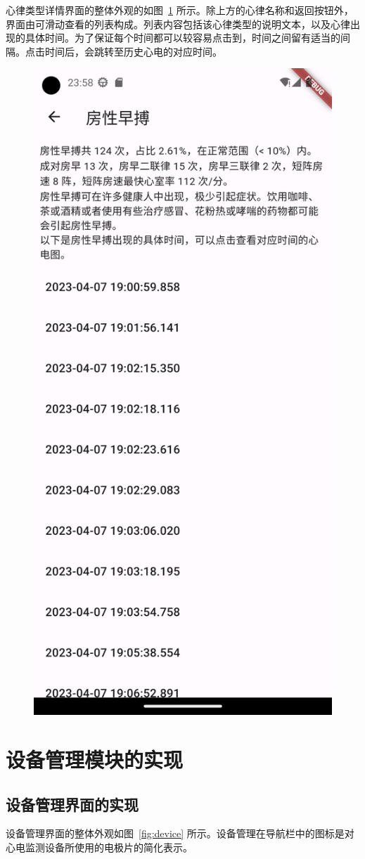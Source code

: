 心律类型详情界面的整体外观的如图~\ref{fig:label-details} 所示。除上方的心律名称和返回按钮外，界面由可滑动查看的列表构成。列表内容包括该心律类型的说明文本，以及心律出现的具体时间。为了保证每个时间都可以较容易点击到，时间之间留有适当的间隔。点击时间后，会跳转至历史心电的对应时间。

\begin{figure}[ht]
    \centering
    \includegraphics[width=.33\textwidth]{../assets/label-details}
    \label{fig:label-details}
\end{figure}



\section{设备管理模块的实现}\label{sec:device}

\subsection{设备管理界面的实现}\label{subsec:device-ui}

设备管理界面的整体外观如图~\ref{fig:device} 所示。设备管理在导航栏中的图标是对心电监测设备所使用的电极片的简化表示。

